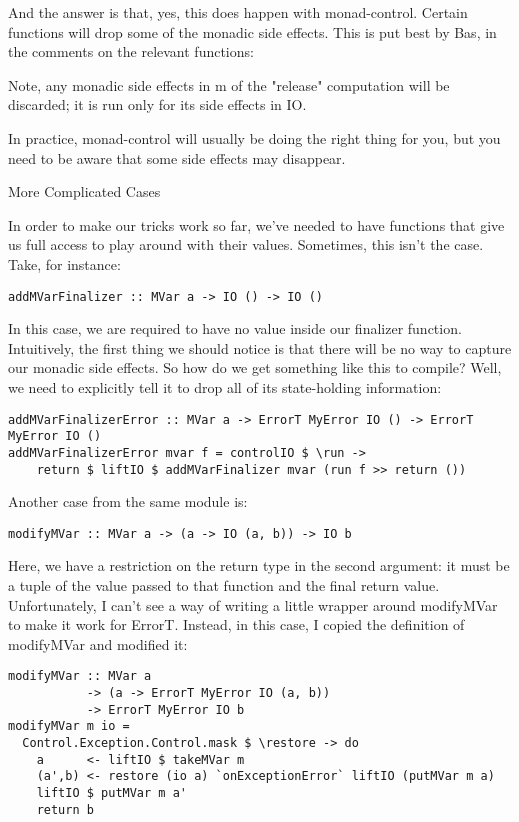 And the answer is that, yes, this does happen with monad-control. Certain functions will drop some of the monadic side effects. This is put best by Bas, in the comments on the relevant functions:

Note, any monadic side effects in m of the "release" computation will be discarded; it is run only for its side effects in IO.

In practice, monad-control will usually be doing the right thing for you, but you need to be aware that some side effects may disappear.

More Complicated Cases

In order to make our tricks work so far, we've needed to have functions that give us full access to play around with their values. Sometimes, this isn't the case. Take, for instance:

\begin{lstlisting}
addMVarFinalizer :: MVar a -> IO () -> IO ()
\end{lstlisting}

In this case, we are required to have no value inside our finalizer function. Intuitively, the first thing we should notice is that there will be no way to capture our monadic side effects. So how do we get something like this to compile? Well, we need to explicitly tell it to drop all of its state-holding information:

\begin{lstlisting}
addMVarFinalizerError :: MVar a -> ErrorT MyError IO () -> ErrorT MyError IO ()
addMVarFinalizerError mvar f = controlIO $ \run ->
    return $ liftIO $ addMVarFinalizer mvar (run f >> return ())
\end{lstlisting}

Another case from the same module is:

\begin{lstlisting}
modifyMVar :: MVar a -> (a -> IO (a, b)) -> IO b
\end{lstlisting}

Here, we have a restriction on the return type in the second argument: it must be a tuple of the value passed to that function and the final return value. Unfortunately, I can't see a way of writing a little wrapper around modifyMVar to make it work for ErrorT. Instead, in this case, I copied the definition of modifyMVar and modified it:

\begin{lstlisting}
modifyMVar :: MVar a
           -> (a -> ErrorT MyError IO (a, b))
           -> ErrorT MyError IO b
modifyMVar m io =
  Control.Exception.Control.mask $ \restore -> do
    a      <- liftIO $ takeMVar m
    (a',b) <- restore (io a) `onExceptionError` liftIO (putMVar m a)
    liftIO $ putMVar m a'
    return b
\end{lstlisting}